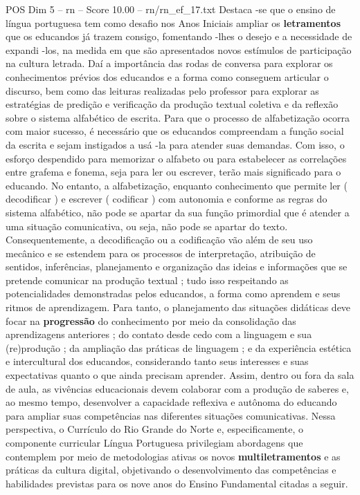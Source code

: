 \begin{textsample}{POS Dim 5 – rn – Score 10.00 – rn/rn\_ef\_17.txt}
Destaca -se que o ensino de língua portuguesa tem como desafio nos Anos Iniciais ampliar os \textbf{letramentos} que os educandos já trazem consigo, fomentando -lhes o desejo e a necessidade de expandi -los, na medida em que são apresentados novos estímulos de participação na cultura letrada.
Daí a importância das rodas de conversa para explorar os conhecimentos prévios dos educandos e a forma como conseguem articular o discurso, bem como das leituras realizadas pelo professor para explorar as estratégias de predição e verificação da produção textual coletiva e da reflexão sobre o sistema alfabético de escrita.
Para que o processo de alfabetização ocorra com maior sucesso, é necessário que os educandos compreendam a função social da escrita e sejam instigados a usá -la para atender suas demandas.
Com isso, o esforço despendido para memorizar o alfabeto ou para estabelecer as correlações entre grafema e fonema, seja para ler ou escrever, terão mais significado para o educando.
No entanto, a alfabetização, enquanto conhecimento que permite ler ( decodificar ) e escrever ( codificar ) com autonomia e conforme as regras do sistema alfabético, não pode se apartar da sua função primordial que é atender a uma situação comunicativa, ou seja, não pode se apartar do texto.
Consequentemente, a decodificação ou a codificação vão além de seu uso mecânico e se estendem para os processos de interpretação, atribuição de sentidos, inferências, planejamento e organização das ideias e informações que se pretende comunicar na produção textual ; tudo isso respeitando as potencialidades demonstradas pelos educandos, a forma como aprendem e seus ritmos de aprendizagem.
Para tanto, o planejamento das situações didáticas deve focar na \textbf{progressão} do conhecimento por meio da consolidação das aprendizagens anteriores ; do contato desde cedo com a linguagem e sua (re)produção ; da ampliação das práticas de linguagem ; e da experiência estética e intercultural dos educandos, considerando tanto seus interesses e suas expectativas quanto o que ainda precisam aprender.
Assim, dentro ou fora da sala de aula, as vivências educacionais devem colaborar com a produção de saberes e, ao mesmo tempo, desenvolver a capacidade reflexiva e autônoma do educando para ampliar suas competências nas diferentes situações comunicativas.
Nessa perspectiva, o Currículo do Rio Grande do Norte e, especificamente, o componente curricular Língua Portuguesa privilegiam abordagens que contemplem por meio de metodologias ativas os novos \textbf{multiletramentos} e as práticas da cultura digital, objetivando o desenvolvimento das competências e habilidades previstas para os nove anos do Ensino Fundamental citadas a seguir.

\end{textsample}
